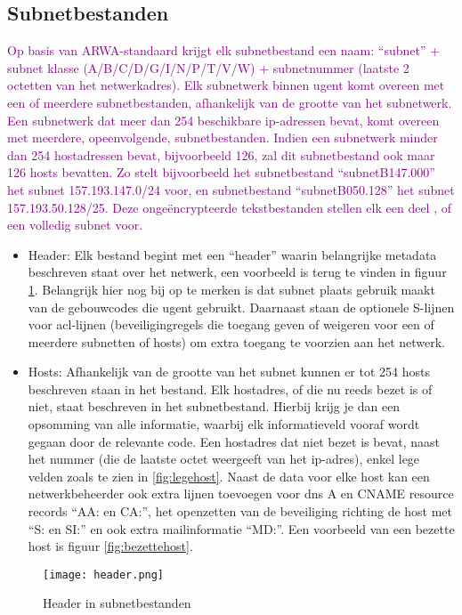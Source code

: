 \subsection{Subnetbestanden}
\label{subnetbestanden}
\textcolor{purple}{Op basis van ARWA-standaard krijgt elk subnetbestand een naam: “subnet” + subnet klasse (A/B/C/D/G/I/N/P/T/V/W) + subnetnummer (laatste 2 octetten van het netwerkadres). Elk subnetwerk binnen \acrshort{ugent} komt overeen met een of meerdere subnetbestanden, afhankelijk van de grootte van het subnetwerk. Een subnetwerk dat meer dan 254 beschikbare \acrshort{ip}-adressen bevat, komt overeen met meerdere, opeenvolgende, subnetbestanden. Indien een subnetwerk minder dan 254 hostadressen bevat, bijvoorbeeld 126, zal dit subnetbestand ook maar 126 hosts bevatten.
Zo stelt bijvoorbeeld het subnetbestand “subnetB147.000” het subnet 157.193.147.0/24 voor, en subnetbestand “subnetB050.128” het subnet 157.193.50.128/25. Deze ongeëncrypteerde tekstbestanden stellen elk een deel , of een volledig subnet voor.}
\begin{itemize}
    \item Header: Elk bestand begint met een “header” waarin belangrijke metadata beschreven staat over het netwerk, een voorbeeld is terug te vinden in figuur \ref{fig:header}. Belangrijk hier nog bij op te merken is dat subnet plaats gebruik maakt van de gebouwcodes die \acrshort{ugent} gebruikt. Daarnaast staan de optionele S-lijnen voor \acrfull{acl}-lijnen (beveiligingregels die toegang geven of weigeren voor een of meerdere subnetten of hosts) om extra toegang te voorzien aan het netwerk. 
    \item Hosts: Afhankelijk van de grootte van het subnet kunnen er tot 254 hosts beschreven staan in het bestand. Elk hostadres, of die nu reeds bezet is of niet, staat beschreven in het subnetbestand. Hierbij krijg je dan een opsomming van alle informatie, waarbij elk informatieveld vooraf wordt gegaan door de relevante code. Een hostadres dat niet bezet is bevat, naast het nummer (die de laatste octet weergeeft van het \acrshort{ip}-adres), enkel lege velden zoals te zien in \ref{fig:legehost}. Naast de data voor elke host kan een netwerkbeheerder ook extra lijnen toevoegen voor \acrshort{dns} A en CNAME resource records “AA: en CA:”, het openzetten van de beveiliging richting de host met “S: en SI:” en ook extra mailinformatie “MD:”. Een voorbeeld van een bezette host is figuur \ref{fig:bezettehost}.
\end{itemize}

\begin{figure}[H]
    \texttt{[image: header.png]}
    \caption{Header in subnetbestanden}
    \label{fig:header}
\end{figure}

